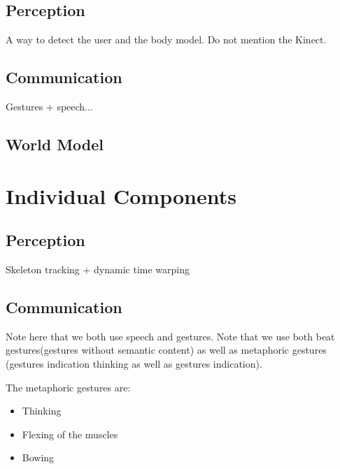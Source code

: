 \documentclass[10pt,a4paper,oneside]{scrartcl}
\begin{document}
\subsection{Perception}
A way to detect the user and the body model. Do not mention the Kinect.

\subsection{Communication}
Gestures + speech...

\subsection{World Model}



\section{Individual Components}

\subsection{Perception}
Skeleton tracking + dynamic time warping

\subsection{Communication}
Note here that we both use speech and gestures. 
Note that we use both beat gestures(gestures without semantic content) as well as metaphoric gestures (gestures indication thinking as well as gestures indication). 

The metaphoric gestures are:
\begin{itemize}
  \item Thinking
  \item Flexing of the muscles
  \item Bowing
\end{itemize}
\end{document}
